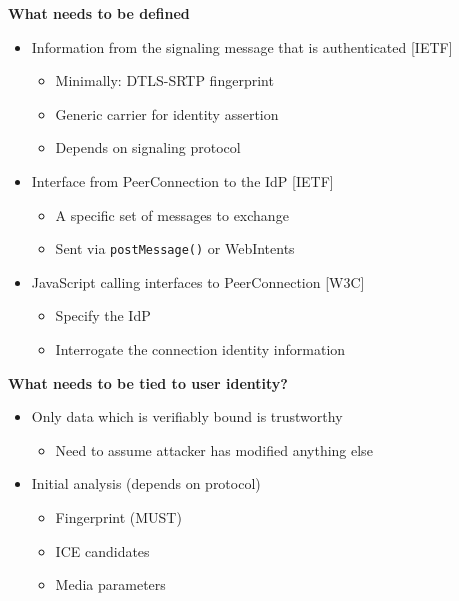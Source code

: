 \documentclass[helvetica]{seminar}
\newcommand{\heading}[1]{%
  \begin{center} 
    \large\bf 
    #1 
  \end{center} 
  \vspace{.4 in}}
\begin{document}
\begin{slide}
\heading{What needs to be defined}

\begin{itemize}
\item Information from the signaling message that is authenticated [IETF]
  \begin{itemize}
  \item Minimally: DTLS-SRTP fingerprint
  \item Generic carrier for identity assertion
  \item Depends on signaling protocol
  \end{itemize}

\item Interface from PeerConnection to the IdP [IETF]
  \begin{itemize}
  \item A specific set of messages to exchange
  \item Sent via \verb^postMessage()^ or WebIntents
  \end{itemize}

\item JavaScript calling interfaces to PeerConnection [W3C]
  \begin{itemize}
  \item Specify the IdP
  \item Interrogate the connection identity information
  \end{itemize}
\end{itemize}
\end{slide}


\begin{slide}
\heading{What needs to be tied to user identity?}

\begin{itemize}
\item Only data which is verifiably bound is trustworthy
  \begin{itemize}
  \item Need to assume attacker has modified anything else
  \end{itemize}

\item Initial analysis (depends on protocol)
  \begin{itemize}
  \item Fingerprint (MUST)
  \item ICE candidates
  \item Media parameters
  \end{itemize}
\end{itemize}
\end{slide}
\end{document}
